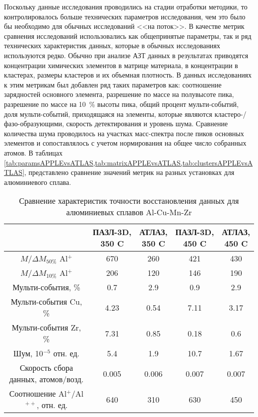 Поскольку данные исследования проводились на стадии отработки методики, то контролировалось больше технических параметров исследования, чем это было бы необходимо для обычных исследований <<на поток>>. В качестве метрик сравнения исследований использовались как общепринятые параметры, так и ряд технических характеристик данных, которые в обычных исследованиях используются редко. Обычно при анализе АЗТ данных в результатах приводятся концентрации химических элементов в матрице материала, в концентрации в кластерах, размеры кластеров и их объемная плотность. В данных исследованиях к этим метрикам был добавлен ряд таких параметров как: соотношение зарядностей основного элемента, разрешение по массе на полувысоте пика, разрешение по массе на 10~\% высоты пика, общий процент мульти-событий, доля мульти-событий, приходящаяся на элементы, которые являются кластеро-/фазо-образующими, скорость детектирования и уровень шума. Сравнение количества шума проводилось на участках масс-спектра после пиков основных элементов и сопоставлялось с учетом нормирования на общее число собранных атомов. В таблицах \cref{tab:paramsAPPLEvsATLAS,tab:matrixAPPLEvsATLAS,tab:clustersAPPLEvsATLAS}, представлено сравнение значений метрик на разных установках для алюминиевого сплава.

\begin{table} [htbp]
	\centering
	\caption{Сравнение характеристик точности восстановления данных для алюминиевых сплавов Al-Cu-Mn-Zr}
	\label{tab:paramsAPPLEvsATLAS}
	\begin{SingleSpace}
		\begin{tabular} {| c | c | c | c | c |}
			\hline
			{} & \thead{ПАЗЛ-3D, \\350 \textdegree C} & \thead{АТЛАЗ, \\350 \textdegree C} & \thead{ПАЗЛ-3D, \\450 \textdegree C} & \thead{АТЛАЗ, \\450 \textdegree C} \\ \hline
			$M/\Delta M_{50\%}$ Al$^+$ & 670  & 260  & 421  & 430               \\ \hline
			$M/\Delta M_{10\%}$ Al$^+$ & 206  & 120  & 146  & 190               \\ \hline
			Мульти-события, \%         & 0.7  & 2.9  & 0.9  & 2.9               \\ \hline
			Мульти-события Cu, \%      & 4.23 & 0.54 & 7.11 & 3.17              \\ \hline
			Мульти-события Zr, \%      & 7.31 & 0.85 & 0.18 & 0.6               \\ \hline
			Шум, 10$^{-5}$ отн. ед. & 5.4   & 1.9   & 10.7  & 1.67  \\ \hline
			Скорость сбора данных, атомов/возд.        & 0.005 & 0.006 & 0.007 & 0.007 \\ \hline
			Соотношение Al$^+$/Al$^{++}$, отн. ед.    & 640   & 310   & 630   & 450   \\ \hline
		\end{tabular}
	\end{SingleSpace}
\end{table}


